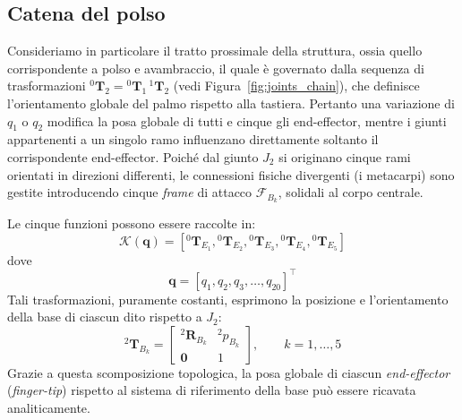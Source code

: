 \subsection{Catena del polso}

Consideriamo in particolare il tratto prossimale della struttura, ossia quello corrispondente a polso e avambraccio, il quale è governato dalla sequenza di trasformazioni ${}^0\boldsymbol{T}_2 = {}^0\boldsymbol{T}_1\,{}^1\boldsymbol{T}_2$ (vedi Figura~\ref{fig:joints_chain}), che definisce l'orientamento globale del palmo rispetto alla tastiera.
Pertanto una variazione di $q_1$ o $q_2$ modifica la posa globale di tutti e cinque gli end-effector, mentre i giunti appartenenti a un singolo ramo influenzano direttamente soltanto il corrispondente end-effector.
Poiché dal giunto $J_2$ si originano cinque rami orientati in direzioni differenti, le connessioni fisiche divergenti (i metacarpi) sono gestite introducendo cinque \textit{frame} di attacco $\mathcal F_{B_k}$, solidali al corpo centrale. 

Le cinque funzioni possono essere raccolte in:
\[
    \mathcal{K}(\mathbf q)=
    \left[
        {}^0\boldsymbol{T}_{E_1},
        {}^0\boldsymbol{T}_{E_2},
        {}^0\boldsymbol{T}_{E_3},
        {}^0\boldsymbol{T}_{E_4},
        {}^0\boldsymbol{T}_{E_5}
    \right]
\]
dove
\[
    \mathbf q = [q_1,q_2,q_3,\ldots,q_{20}]^\top
\]
Tali trasformazioni, puramente costanti, esprimono la posizione e l'orientamento della base di ciascun dito rispetto a $J_2$:
\begin{equation}
    {}^2\boldsymbol{T}_{B_k}=
    \begin{bmatrix}
    {}^2\boldsymbol{R}_{B_k} & {}^2p_{B_k}\\ 
    \boldsymbol{0} & 1
    \end{bmatrix},
    \qquad k=1,\ldots,5
\end{equation}
Grazie a questa scomposizione topologica, la posa globale di ciascun \textit{end-effector} (\textit{finger-tip}) rispetto al sistema di riferimento della base può essere ricavata analiticamente. 

